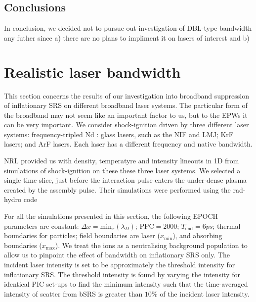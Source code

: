 \subsection{Conclusions}
In conclusion, we decided not to pursue out investigation of DBL-type bandwidth any futher since a) there are no plans to impliment it on lasers of interest and b) 


\section{Realistic laser bandwidth}\label{sec:params}

This section concerns the results of our investigation into broadband suppression of inflationary SRS on different broadband laser systems. The particular form of the broadband may not seem like an important factor to us, but to the EPWs it can be very important.
We consider shock-ignition driven by three different laser systems: frequency-tripled Nd : glass lasers, such as the NIF and LMJ; KrF lasers; and ArF lasers. Each laser has a different frequency and native bandwidth. 

NRL provided us with density, temperatyre and intensity lineouts in 1D from simulations of shock-ignition on these these three laser systems. We selected a single time slice, just before the interaction pulse enters the under-dense plasma created by the assembly pulse. Their simulations were performed using the rad-hydro code 

For all the simulations presented in this section, the following EPOCH parameters are constant: $\Delta x = \mathrm{min}_x(\lambda_D)$; $\mathrm{PPC} = 2000$; $T_{\mathrm{end}}=6\si{ps}$; thermal boundaries for particles; field boundaries are laser ($x_{\mathrm{min}}$), and absorbing boundaries ($x_{\mathrm{max}}$). We treat the ions as a neutralising background population to allow us to pinpoint the effect of bandwidth on inflationary SRS only. The incident laser intensity is set to be approximately the threshold intensity for inflationary SRS. The threshold intensity is found by varying the intensity for identical PIC set-ups to find the minimum intensity such that the time-averaged intensity of scatter from bSRS is greater than $10\%$ of the incident laser intensity. 

